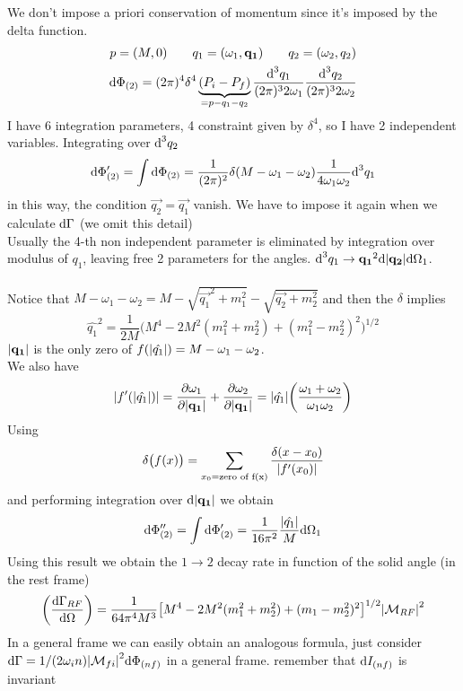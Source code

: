 \documentclass[TheoreticalPhy_ModB.tex]{subfiles}
\begin{document}
\begin{example}[1 $\to$ 2 decay]
We don't impose a priori conservation of momentum since it's imposed by the delta function.
\begin{gather}
p = (M, 0) \qquad
q_1 = (\omega_1, \mathbf{q_1}) \qquad
q_2 = (\omega_2, q_2) \notag \\
\textup{d} \Phi_{(2)} = (2 \pi)^4 \delta^4 \underbrace{(P_i - P_f)}_{= p - q_1 - q_2}
	\frac{\textup{d}^3 q_1}{(2 \pi)^3 2 \omega_1} \frac{\textup{d}^3 q_2}{(2 \pi)^3 2 \omega_2} \notag
\end{gather}
I have 6 integration parameters, 4 constraint given by $\delta^4$, so I have 2 independent variables. Integrating over $\textup{d}^3 q_2$
\[
\textup{d} \Phi'_{(2)} = \int \textup{d} \Phi_{(2)} = \frac{1}{(2 \pi)^2} \delta(M - \omega_1 - \omega_2) \frac{1}{4 \omega_1 \omega_2} \textup{d}^3 q_1
\]
in this way, the condition $\vec{q_2} = \vec{q_1}$ vanish. We have to impose it again when we calculate $\textup{d} \Gamma$ (we omit this detail)\\
Usually the 4-th non independent parameter is eliminated by integration over modulus of $q_1$, leaving free 2 parameters for the angles. 
$\textup{d}^3 q_1 \to \mathbf{q_1}^2 \textup{d} \abs{\mathbf{q_2}}\textup{d} \Omega_1$.\\ \\
Notice that $M -\omega_1 - \omega_2 = M - \sqrt{\vec{q_1}^2 + m_1^2} - \sqrt{\vec{q_2} + m_2^2}$ and then the $\delta$ implies
\[
\hat{q_1}^2 = \frac{1}{2M} \biggl( M^4 - 2M^2(m_1^2 + m_2^2) + (m_1^2 - m_2^2)^2 \biggr)^{1/2}
\]
$\abs{\mathbf{q_1}}$ is the only zero of $f(\abs{\hat{q_1}}) = M - \omega_1 - \omega_2$.\\
We also have
\[
\abs{f'(\abs{\hat{q_1}})} = \frac{\partial \omega_1}{\partial \abs{\mathbf{q_1}}} 
	+ \frac{\partial \omega_2}{\partial \abs{\mathbf{q_1}}} 
	= \abs{\hat{q_1}} \biggl ( \frac{\omega_1 + \omega_2}{\omega_1 \omega_2} \biggr)
\]
Using
\[
\delta \bigl( f(x) \bigr) = \sum_{x_0 = \textup{zero of f(x)}} \frac{\delta (x - x_0)}{\abs{f'(x_0)}} 
\]
and performing integration over $\textup{d} \abs{\mathbf{q_1}}$ we obtain
\[
\textup{d} \Phi''_{(2)} = \int \textup{d} \Phi'_{(2)} = \frac{1}{16 \pi^2} \frac{\abs{\hat{q_1}}}{M} \textup{d} \Omega_1
\]
Using this result we obtain the $1 \to 2$ decay rate in function of the solid angle (in the rest frame)
\[
\biggl( \frac{\textup{d} \Gamma_{RF}}{\textup{d} \Omega} \biggr) = \frac{1}{64 \pi^4 M^3}
	\bigl[ M^4 - 2M^2 (m_1^2 + m_2^2) + (m_1 - m_2^2)^2 \bigr]^{1/2} \abs{\mathcal{M}_{RF}}^2
\]
In a general frame we can easily obtain an analogous formula, just consider $\textup{d} \Gamma = 1/(2 \omega_in) \abs{\mathcal{M}_{fi}}^2 \textup{d} \Phi_{(nf)}$ in a general frame. remember that $\textup{d} I_{(nf)}$ is invariant \\ \\

\end{example}
\end{document}

